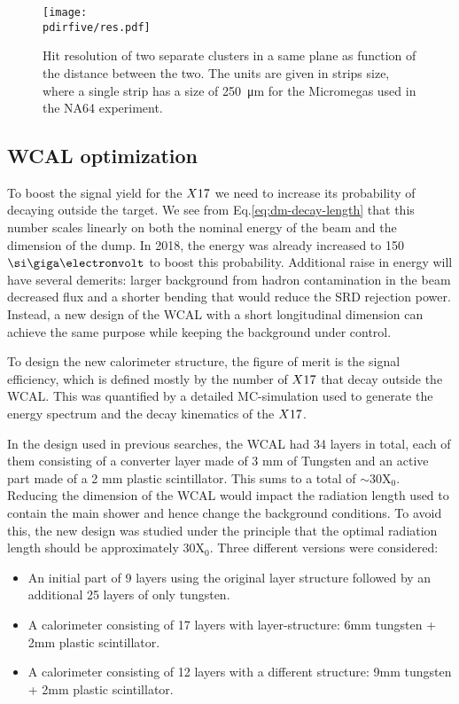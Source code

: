 \begin{figure}[tbh!]
  \centering
  \texttt{[image: \\pdirfive/res.pdf]}
  \caption[Hit resolution as function of the two cluster distance]{Hit resolution of two separate clusters in a same plane as function of the distance between the two. The units are given in strips size, where a single strip has a size of \SI{250}{\micro\meter} for the Micromegas used in the NA64 experiment.}
  \label{fig:res-hit}
\end{figure}

\subsection{WCAL optimization}
\label{ch5:sec:new-vismode-setup-wcal}

To boost the signal yield for the $X17$ we need to increase its probability of decaying outside the target. We see from Eq.\ref{eq:dm-decay-length} that this number scales linearly on both the nominal energy of the beam and the dimension of the dump. In 2018, the energy was already increased to 150 $\gev$ to boost this probability. Additional raise in energy will have several demerits: larger background from hadron contamination in the beam decreased flux and a shorter bending that would reduce the SRD rejection power. Instead, a new design of the WCAL with a short longitudinal dimension can achieve the same purpose while keeping the background under control.

To design the new calorimeter structure, the figure of merit is the signal efficiency, which is defined mostly by the number of $X17$ that decay outside the WCAL. This was quantified by a detailed MC-simulation used to generate the energy spectrum and the decay kinematics of the $X17$.

In the design used in previous searches, the WCAL had 34 layers in total, each of them consisting of a converter layer made of 3 mm of Tungsten and an active part made of a 2 mm plastic scintillator. This sums to a total of $\sim$30X$_0$. Reducing the dimension of the WCAL would impact the radiation length used to contain the main shower and hence change the background conditions. To avoid this, the new design was studied under the principle that the optimal radiation length should be approximately 30X$_0$. Three different versions were considered:

\begin{itemize}
\item An initial part of 9 layers using the original layer structure followed by an additional 25 layers of only tungsten.
\item A calorimeter consisting of 17 layers with layer-structure: 6mm tungsten + 2mm plastic scintillator.
\item A calorimeter consisting of 12 layers with a different structure: 9mm tungsten + 2mm plastic scintillator.
\end{itemize}

